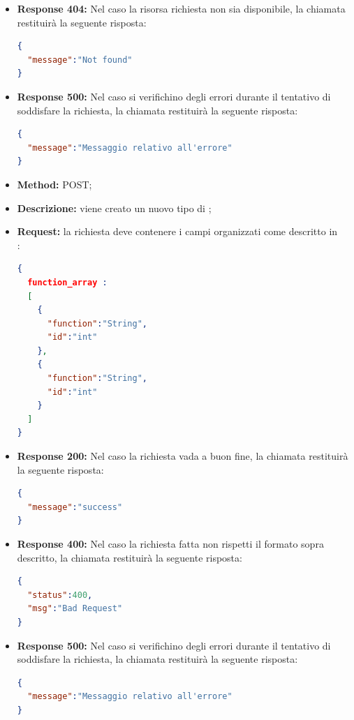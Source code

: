 \begin{itemize}
\begin{itemize}
\item \textbf{Response 404:} Nel caso la risorsa richiesta non sia disponibile, la chiamata restituirà la seguente risposta:
\begin{lstlisting}[language=json,firstnumber=1]
{
  "message":"Not found"
}
\end{lstlisting}
\item \textbf{Response 500:} Nel caso si verifichino degli errori durante il tentativo di soddisfare la richiesta, la chiamata restituirà la seguente risposta:
\begin{lstlisting}[language=json,firstnumber=1]
{
  "message":"Messaggio relativo all'errore"
}
\end{lstlisting}
\end{itemize}

\begin{itemize}
\item \textbf{Method:} POST;
\item \textbf{Descrizione:} viene creato un nuovo tipo di ;
\item \textbf{Request:} la richiesta deve contenere i campi organizzati come descritto in \\:
\begin{lstlisting}[language=json,firstnumber=1]
{
  function_array :
  [
    {
      "function":"String",
      "id":"int"
    },
    {
      "function":"String",
      "id":"int"
    }
  ]
}
\end{lstlisting}

\item \textbf{Response 200:} Nel caso la richiesta vada a buon fine, la chiamata restituirà la seguente risposta:
\begin{lstlisting}[language=json,firstnumber=1]
{
  "message":"success"
}
\end{lstlisting}
\item \textbf{Response 400:} Nel caso la richiesta fatta non rispetti il formato sopra descritto, la chiamata restituirà la seguente risposta:
\begin{lstlisting}[language=json,firstnumber=1]
{
  "status":400,
  "msg":"Bad Request"
}
\end{lstlisting}
\item \textbf{Response 500:} Nel caso si verifichino degli errori durante il tentativo di soddisfare la richiesta, la chiamata restituirà la seguente risposta:
\begin{lstlisting}[language=json,firstnumber=1]
{
  "message":"Messaggio relativo all'errore"
}
\end{lstlisting}\end{itemize}




\end{itemize}
